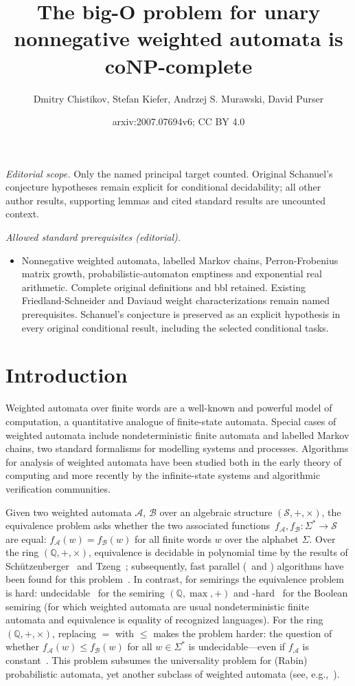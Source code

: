 \documentclass[10pt,a4paper]{amsart}
\title{The big-O problem for unary nonnegative weighted automata is coNP-complete}
\author{Dmitry Chistikov, Stefan Kiefer, Andrzej S. Murawski, David Purser}
\date{arxiv:2007.07694v6; CC BY 4.0}
\numberwithin{equation}{section}
\theoremstyle{plain}
\theoremstyle{definition}
\theoremstyle{remark}
\begin{document}
\maketitle
\noindent\textit{Editorial scope.} Only the named principal target counted. Original Schanuel's conjecture hypotheses remain explicit for conditional decidability; all other author results, supporting lemmas and cited standard results are uncounted context.\par\medskip
\noindent\textit{Allowed standard prerequisites (editorial).}\begin{itemize}
\item Nonnegative weighted automata, labelled Markov chains, Perron-Frobenius matrix growth, probabilistic-automaton emptiness and exponential real arithmetic. Complete original definitions and bbl retained. Existing Friedland-Schneider and Daviaud weight characterizations remain named prerequisites. Schanuel's conjecture is preserved as an explicit hypothesis in every original conditional result, including the selected conditional tasks.
\end{itemize}\medskip
\section{Introduction}\label{sec:intro}

Weighted automata over finite words
are a well-known and powerful model of computation,
a quantitative analogue of finite-state automata.
Special cases of weighted automata include
nondeterministic finite automata
and labelled Markov chains, two standard formalisms for modelling systems
and processes.
Algorithms for analysis of weighted automata have been studied
both in the early theory of computing and
more recently by the infinite-state systems and algorithmic verification
communities.

Given two weighted automata $\mathcal A$, $\mathcal B$
over an algebraic structure $(\mathcal S, {+}, {\times})$,
the equivalence problem asks whether the two associated functions~$f_{\mathcal A}, f_{\mathcal B} \colon \Sigma^* \to \mathcal S$
are equal: $f_{\mathcal A}(w) = f_{\mathcal B}(w)$ for all finite
words $w$ over the alphabet $\Sigma$.
Over the ring $(\mathbb Q, {+}, {\times})$,
equivalence
is decidable in polynomial time by the results of
Sch\"utzenberger~\cite{schutzenberger1961definition} and Tzeng~\cite{tzeng1992polynomial};
subsequently, fast parallel (\NC\ and \RNC) algorithms have been found
for this problem~\cite{Tzeng96,kiefer2013complexity}.
In contrast, for semirings the equivalence problem is hard:
undecidable~\cite{Krob94,AlmagorBK11} for the semiring $(\mathbb Q, {\max}, {+})$
and \PSPACE-hard~\cite{MS72} for the Boolean semiring
(for which weighted automata are usual nondeterministic finite automata
 and equivalence is equality of recognized languages).
For the ring $(\mathbb Q, {+}, {\times})$, replacing $=$ with $\le$ makes the problem harder:
the question of whether $f_{\mathcal A}(w) \le f_{\mathcal B}(w)$
for all $w \in \Sigma^*$ is undecidable---even if $f_{\mathcal A}$ is constant~\cite{paz2014introduction}.
This problem subsumes the universality problem for (Rabin) probabilistic automata,
yet another subclass of weighted automata (see, e.g.,~\cite{fijalkow2017undecidability}).
\end{document}
